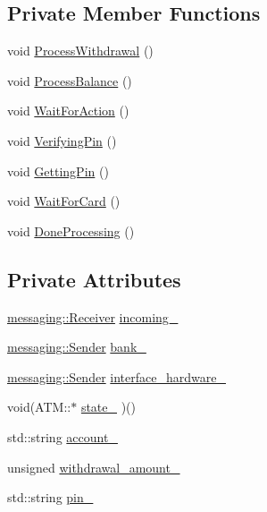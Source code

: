 \subsection*{Private Member Functions}
\begin{DoxyCompactItemize}
\item 
void \hyperlink{classATM_aa8ee553ff388f9977f1a504fed5eb946}{Process\-Withdrawal} ()
\item 
void \hyperlink{classATM_a4adb797522de2abb66dadd033f11a8f7}{Process\-Balance} ()
\item 
void \hyperlink{classATM_adb4a5188bec74d4cd199acdd6e62941d}{Wait\-For\-Action} ()
\item 
void \hyperlink{classATM_a1378674f5e175c6f99cccb8b848e3512}{Verifying\-Pin} ()
\item 
void \hyperlink{classATM_a2a182a5996cbed4122a9c1afd2f1697a}{Getting\-Pin} ()
\item 
void \hyperlink{classATM_ae530dbaa0e091b13f919542d002ef216}{Wait\-For\-Card} ()
\item 
void \hyperlink{classATM_accef2f77884d7272e7fe3cdfc210ba35}{Done\-Processing} ()
\end{DoxyCompactItemize}
\subsection*{Private Attributes}
\begin{DoxyCompactItemize}
\item 
\hyperlink{classmessaging_1_1Receiver}{messaging\-::\-Receiver} \hyperlink{classATM_a59b7d4c15875982aef0399de08d1c6c0}{incoming\-\_\-}
\item 
\hyperlink{classmessaging_1_1Sender}{messaging\-::\-Sender} \hyperlink{classATM_ad4f43517a9785b318afb336355672efe}{bank\-\_\-}
\item 
\hyperlink{classmessaging_1_1Sender}{messaging\-::\-Sender} \hyperlink{classATM_aeffb0e1f17d32a7dcf2f84643390e614}{interface\-\_\-hardware\-\_\-}
\item 
void(A\-T\-M\-::$\ast$ \hyperlink{classATM_ad655bcb7436d78fba4b0d16ab9a15ff1}{state\-\_\-} )()
\item 
std\-::string \hyperlink{classATM_a25cd6fda12c3a95144d820de539adee6}{account\-\_\-}
\item 
unsigned \hyperlink{classATM_a45c2bec3b3f822e15db0304d7ed26529}{withdrawal\-\_\-amount\-\_\-}
\item 
std\-::string \hyperlink{classATM_abf1480605c201cac7d94e0057c372517}{pin\-\_\-}
\end{DoxyCompactItemize}


